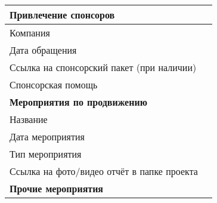 \documentclass{article}
\begin{document}
\begin{longtable}{|p{5cm}|p{5cm}|}
    \hline
    \textbf{Привлечение спонсоров} &  \\
    \hline
    Компания & \\
    Дата обращения & \\
    Ссылка на спонсорский пакет (при наличии) & \\
    Спонсорская помощь & \\
    \hline
    \textbf{Мероприятия по продвижению} &  \\
    \hline
    Название & \\
    Дата мероприятия & \\
    Тип мероприятия & \\
    Ссылка на фото/видео отчёт в папке проекта & \\
    \hline
    \textbf{Прочие мероприятия} &  \\
    \hline
\end{longtable}
\end{document}
